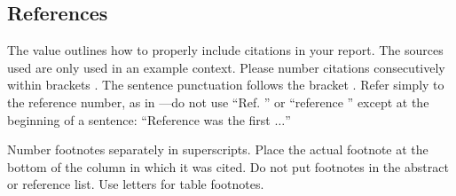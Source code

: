 





















\subsection{References}
The value outlines how to properly include citations in your report. The sources used are only used in an example context.
Please number citations consecutively within brackets \cite{halter2008electrical}. The sentence punctuation follows the bracket \cite{jossinet1998impedivity}. Refer simply to the reference number, as in \cite{cole1941dispersion}---do not use ``Ref. \cite{cole1941dispersion}'' or ``reference \cite{cole1941dispersion}'' except at the beginning of a sentence: ``Reference \cite{cole1941dispersion} was the first $\ldots$''



Number footnotes separately in superscripts. Place the actual footnote at 
the bottom of the column in which it was cited. Do not put footnotes in the 
abstract or reference list. Use letters for table footnotes.



